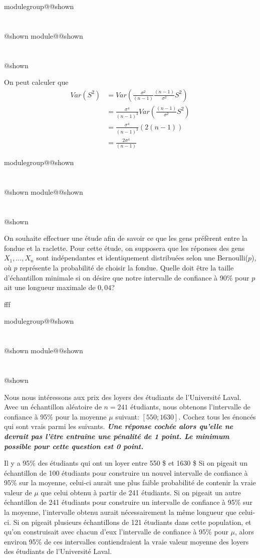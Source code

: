 \documentclass{Evaluation}
\makeatletter
\newcommand{\currentmodulekey}{}
\newcommand{\currentmoduletitle}{}
\newcommand{\currentgroupkey}{}
\newcommand{\currentgrouptitle}{}
\newcommand{\showmoduleifneeded}{%
  \ifx\currentgroupkey\empty\else
    \expandafter\ifx\csname modulegroup@\currentgroupkey @shown\endcsname\relax
      \section*{\currentgrouptitle}%
      \expandafter\gdef\csname modulegroup@\currentgroupkey @shown\endcsname{1}%
    \fi
  \fi
  \expandafter\ifx\csname module@\currentmodulekey @shown\endcsname\relax
    \section*{\currentmoduletitle}%
    \expandafter\gdef\csname module@\currentmodulekey @shown\endcsname{1}%
  \fi
}
\newenvironment{A22}{\showmoduleifneeded}{}
\newenvironment{H23}{\showmoduleifneeded}{}
\makeatother
\begin{document}
\begin{questions}
\begin{A22}
\begin{solution}
On peut calculer que 
\begin{align*}
Var(S^2) &= Var\left( \frac{\sigma^2}{(n-1)}\frac{(n-1)}{\sigma^2}S^2 \right)\\
    &= \frac{\sigma^4}{(n-1)^2} Var\left(\frac{(n-1)}{\sigma^2}S^2\right)  \\
    &= \frac{\sigma^4}{(n-1)^2}(2(n-1)) \\
    &= \frac{2\sigma^4}{(n-1)}
\end{align*}
\end{solution}
\end{A22}

\begin{A22}
\question {} %
On souhaite effectuer une étude afin de savoir ce que les gens préfèrent entre la fondue et la raclette. Pour cette étude, on supposera que les réponses des gens $X_1,\hdots,X_n$ sont indépendantes et identiquement distribuées selon une Bernoulli($p$), où $p$ représente la probabilité de choisir la fondue. Quelle doit être la taille d'échantillon minimale si on désire que notre intervalle de confiance à 90\% pour $p$ ait une longueur maximale de $0,04$?
\begin{solution}
    fff
\end{solution}
\end{A22}

\begin{H23}
\question {} %
Nous nous intéressons aux prix des loyers des étudiants de l'Université Laval. 
Avec un échantillon aléatoire de $n=241$ étudiants, nous obtenons l'intervalle de confiance à 95\%  pour la moyenne $\mu$ suivant: $[550;1630]$. 
Cochez tous les énoncés qui sont vrais parmi les suivants. \textit{\textbf{Une réponse cochée alors qu'elle ne devrait pas l'être entraîne une pénalité de 1 point. Le minimum possible pour cette question est 0 point.}}
 
\begin{checkboxes}
\choice Il y a 95\% des étudiants qui ont un loyer entre 550 \$ et 1630 \$
\choice Si on pigeait un échantillon de 100 étudiants pour construire un nouvel intervalle de confiance à 95\% sur la moyenne, celui-ci aurait une plus faible probabilité de contenir la vraie valeur de $\mu$ que celui obtenu à partir de 241 étudiants.
\choice Si on pigeait un autre échantillon de 241 étudiants pour construire un intervalle de confiance à 95\% sur la moyenne, l'intervalle obtenu aurait nécessairement la même longueur que celui-ci.
\correctchoice Si on pigeait plusieurs échantillons de 121 étudiants dans cette population, et qu'on construisait avec chacun d'eux l'intervalle de confiance à 95\% pour $\mu$, alors environ 95\% de ces intervalles contiendraient la vraie valeur moyenne des loyers des étudiants de l'Université Laval. 
\end{checkboxes}
\end{H23}


\end{questions}
\end{document}
